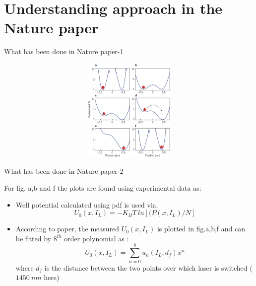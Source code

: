\documentclass{beamer}
\begin{document}
\section{Understanding approach in the Nature paper}
\begin{frame}{What has been done in Nature paper-1} 

\begin{figure}
    \centering
    \includegraphics[height=5cm,width=12cm]{nature_landauer_fig1.eps}
    \label{fig:graph26}
\end{figure}

\end{frame}
\begin{frame}{What has been done in Nature paper-2} 

For fig. a,b and f the plots are found using experimental data as:
\begin{itemize}

\item Well potential calculated using pdf is used via.
\begin{equation*}
U_0(x,I_L) = -K_BT~ln[(P(x,I_L)/N]
\end{equation*}
\item According to paper, the measured $U_0(x,I_L)$ is plotted in fig.a,b,f and can be fitted by $8^{th}$ order polynomial as :
\begin{equation*}
U_0(x,I_L) = \sum_{n=0}^8 u_n(I_L,d_f)x^n
\end{equation*}
where $d_f$ is the distance between the two points over which laser is switched ($1450~nm$ here)

\end{itemize}

\end{frame}
\end{document}
